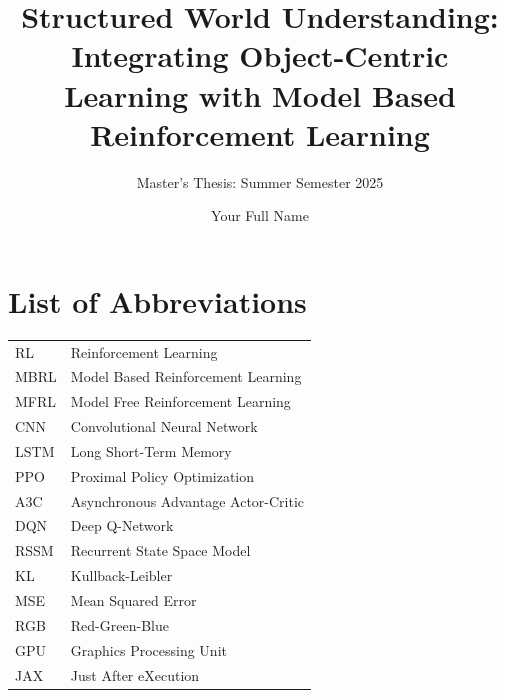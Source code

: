 \documentclass[
	english,
	ruledheaders=section,
	class=report,
	thesis={type=master},
	accentcolor=9c,
	custommargins=true,
	marginpar=false,
	parskip=half-,
	fontsize=11pt,
]{tudapub}
\begin{document}

\title{Structured World Understanding: Integrating Object-Centric Learning with Model Based Reinforcement Learning}
\subtitle{Master's Thesis: Summer Semester 2025}
\author[Y. Name]{Your Full Name}



\maketitle

\affidavit

\tableofcontents
\listoffigures
\listoftables

\chapter*{List of Abbreviations}
\begin{tabular}{ll}
	RL   & Reinforcement Learning              \\
	MBRL & Model Based Reinforcement Learning  \\
	MFRL & Model Free Reinforcement Learning   \\
	CNN  & Convolutional Neural Network        \\
	LSTM & Long Short-Term Memory              \\
	PPO  & Proximal Policy Optimization        \\
	A3C  & Asynchronous Advantage Actor-Critic \\
	DQN  & Deep Q-Network                      \\
	RSSM & Recurrent State Space Model         \\
	KL   & Kullback-Leibler                    \\
	MSE  & Mean Squared Error                  \\
	RGB  & Red-Green-Blue                      \\
	GPU  & Graphics Processing Unit            \\
	JAX  & Just After eXecution                \\
\end{tabular}
\end{document}

